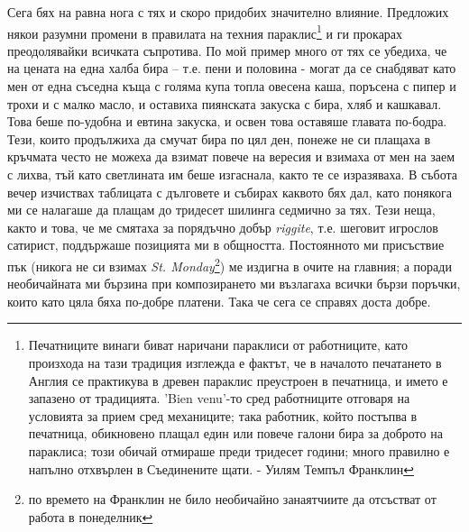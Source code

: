 \documentclass[12pt]{book}
\begin{document}
Сега бях на равна нога с тях и скоро придобих значително влияние. Предложих някои разумни промени в правилата на техния параклис\footnote{Печатниците винаги биват наричани параклиси от работниците, като произхода на тази традиция изглежда е фактът, че в началото печатането в Англия се практикува в древен параклис преустроен в печатница, и името е запазено от традицията. 'Bien venu'-то сред работниците отговаря на условията за прием сред механиците; така работник, който постъпва в печатница, обикновено плащал един или повече галони бира за доброто на параклиса; този обичай отмираше преди тридесет години; много правилно е напълно отхвърлен в Съединените щати. - Уилям Темпъл Франклин } и ги прокарах преодолявайки всичката съпротива. По мой пример много от тях се убедиха, че на цената на една халба бира – т.е. пени и половина - могат да се снабдяват като мен от една съседна къща с голяма купа топла овесена каша, поръсена с пипер и трохи и с малко масло, и оставиха пиянската закуска с бира, хляб и кашкавал. Това беше по-удобна и евтина закуска, и освен това оставяше главата по-бодра. Тези, които продължиха да смучат бира по цял ден, понеже не си плащаха в кръчмата често не можеха да взимат повече на вересия и взимаха от мен на заем с лихва, тъй като светлината им беше изгаснала, както те се изразяваха. В събота вечер изчиствах таблицата с дълговете и събирах каквото бях дал, като понякога ми се налагаше да плащам до тридесет шилинга седмично за тях. Тези неща, както и това, че ме смятаха за порядъчно добър \textit{riggite}, т.е. шеговит игрослов сатирист, поддържаше позицията ми в общността. Постоянното ми присъствие пък (никога не си взимах \textit{St. Monday}\footnote{по времето на Франклин не било необичайно занаятчиите да отсъстват от работа в понеделник}) ме издигна в очите на главния; а поради необичайната ми бързина при композирането ми възлагаха всички бързи поръчки, които като цяла бяха по-добре платени. Така че сега се справях доста добре.
\end{document}
